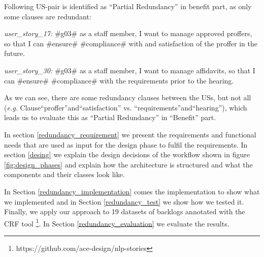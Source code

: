 \begin{example}
	Following US-pair is identified as \enquote{Partial Redundancy} in benefit part, as only some clauses are redundant:
	
	\textit{user\_story\_17:} \#g03\# as a staff member, I want to manage approved proffers, so that I can \#ensure\# \#compliance\# with and satisfaction of the proffer in the future.
	
	\textit{user\_story\_30:} \#g03\# as a staff member, I want to manage affidavits, so that I can \#ensure\# \#compliance\# with the requirements prior to the hearing.
	
	As we can see, there are some redundancy clauses between the USs, but not all (\textit{e.g.} Clause\enquote{proffer}and\enquote{satisfaction} vs. \enquote{requirements}and\enquote{hearing}), which leads us to evaluate this as \enquote{Partial Redundancy} in \enquote{Benefit} part.
\end{example} 



In section \ref{redundancy_requirement} we present the requirements and functional needs that are used as input for the design phase to fulfil the requirements. In section \ref{desing} we explain the design decisions of the workflow shown in figure \ref{fig:design_phases} and explain how the architecture is structured and what the components and their classes look like. 

In Section \ref{redundancy_implementation} comes the implementation to show what we implemented and in Section \ref{redundancy_test} we show how we tested it. Finally, we apply our approach to 19 datasets of backlogs annotated with the CRF tool \footnote {https://github.com/ace-design/nlp-stories}. In Section \ref{redundancy_evaluation} we evaluate the results.
